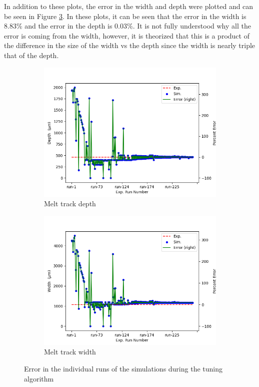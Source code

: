 \documentclass[pdflatex,sn-mathphys]{sn-jnl}
\begin{document}
	In addition to these plots, the error in the width and depth were plotted and can be seen in Figure \ref{fig:tuning_error_complete}.  In these plots, it can be seen that the error in the width is 8.83\% and the error in the depth is 0.03\%.  It is not fully understood why all the error is coming from the width, however, it is theorized that this is a product of the difference in the size of the width vs the depth since the width is nearly triple that of the depth.
	\begin{figure}[!htb]\centering
		\begin{subfigure}[c]{0.475\textwidth}\centering
		\includegraphics[width=\textwidth]{tuning_error_depth_complete}
		\caption{Melt track depth}
		\label{fig:tuning_error_depth_complete}
		\end{subfigure}\hfill{}
			\begin{subfigure}[c]{0.475\textwidth}\centering
			\includegraphics[width=\textwidth]{tuning_error_width_complete}
			\caption{Melt track width}
			\label{fig:tuning_error_width_complete}
			\end{subfigure}
		\caption{Error in the individual runs of the simulations during the tuning algorithm}
		\label{fig:tuning_error_complete}
	\end{figure}
	
\end{document}
